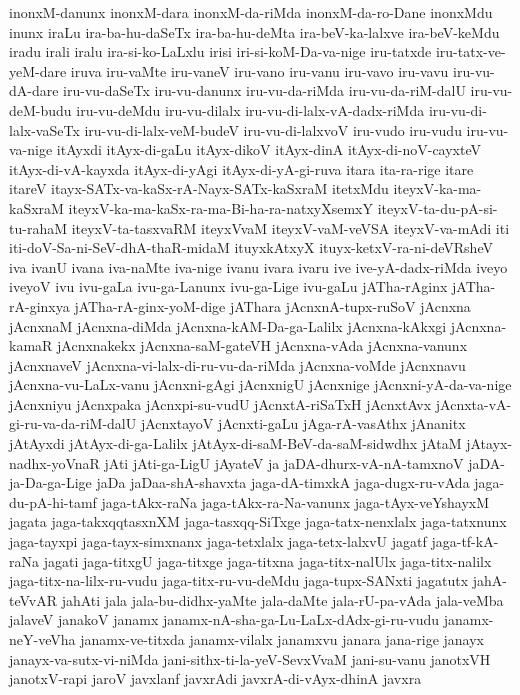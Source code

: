 {inonxM-danunx
inonxM-dara
inonxM-da-riMda
inonxM-da-ro-Dane
inonxMdu
inunx
iraLu
ira-ba-hu-daSeTx
ira-ba-hu-deMta
ira-beV-ka-lalxve
ira-beV-keMdu
iradu
irali
iralu
ira-si-ko-LaLxlu
irisi
iri-si-koM-Da-va-nige
iru-tatxde
iru-tatx-ve-yeM-dare
iruva
iru-vaMte
iru-vaneV
iru-vano
iru-vanu
iru-vavo
iru-vavu
iru-vu-dA-dare
iru-vu-daSeTx
iru-vu-danunx
iru-vu-da-riMda
iru-vu-da-riM-dalU
iru-vu-deM-budu
iru-vu-deMdu
iru-vu-dilalx
iru-vu-di-lalx-vA-dadx-riMda
iru-vu-di-lalx-vaSeTx
iru-vu-di-lalx-veM-budeV
iru-vu-di-lalxvoV
iru-vudo
iru-vudu
iru-vu-va-nige
itAyxdi
itAyx-di-gaLu
itAyx-dikoV
itAyx-dinA
itAyx-di-noV-cayxteV
itAyx-di-vA-kayxda
itAyx-di-yAgi
itAyx-di-yA-gi-ruva
itara
ita-ra-rige
itare
itareV
itayx-SATx-va-kaSx-rA-Nayx-SATx-kaSxraM
itetxMdu
iteyxV-ka-ma-kaSxraM
iteyxV-ka-ma-kaSx-ra-ma-Bi-ha-ra-natxyXsemxY
iteyxV-ta-du-pA-si-tu-rahaM
iteyxV-ta-tasxvaRM
iteyxVvaM
iteyxV-vaM-veVSA
iteyxV-va-mAdi
iti
iti-doV-Sa-ni-SeV-dhA-thaR-midaM
ituyxkAtxyX
ituyx-ketxV-ra-ni-deVRsheV
iva
ivanU
ivana
iva-naMte
iva-nige
ivanu
ivara
ivaru
ive
ive-yA-dadx-riMda
iveyo
iveyoV
ivu
ivu-gaLa
ivu-ga-Lanunx
ivu-ga-Lige
ivu-gaLu
jATha-rAginx
jATha-rA-ginxya
jATha-rA-ginx-yoM-dige
jAThara
jAcnxnA-tupx-ruSoV
jAcnxna
jAcnxnaM
jAcnxna-diMda
jAcnxna-kAM-Da-ga-Lalilx
jAcnxna-kAkxgi
jAcnxna-kamaR
jAcnxnakekx
jAcnxna-saM-gateVH
jAcnxna-vAda
jAcnxna-vanunx
jAcnxnaveV
jAcnxna-vi-lalx-di-ru-vu-da-riMda
jAcnxna-voMde
jAcnxnavu
jAcnxna-vu-LaLx-vanu
jAcnxni-gAgi
jAcnxnigU
jAcnxnige
jAcnxni-yA-da-va-nige
jAcnxniyu
jAcnxpaka
jAcnxpi-su-vudU
jAcnxtA-riSaTxH
jAcnxtAvx
jAcnxta-vA-gi-ru-va-da-riM-dalU
jAcnxtayoV
jAcnxti-gaLu
jAga-rA-vasAthx
jAnanitx
jAtAyxdi
jAtAyx-di-ga-Lalilx
jAtAyx-di-saM-BeV-da-saM-sidwdhx
jAtaM
jAtayx-nadhx-yoVnaR
jAti
jAti-ga-LigU
jAyateV
ja
jaDA-dhurx-vA-nA-tamxnoV
jaDA-ja-Da-ga-Lige
jaDa
jaDaa-shA-shavxta
jaga-dA-timxkA
jaga-dugx-ru-vAda
jaga-du-pA-hi-tamf
jaga-tAkx-raNa
jaga-tAkx-ra-Na-vanunx
jaga-tAyx-veYshayxM
jagata
jaga-takxqqtasxnXM
jaga-tasxqq-SiTxge
jaga-tatx-nenxlalx
jaga-tatxnunx
jaga-tayxpi
jaga-tayx-simxnanx
jaga-tetxlalx
jaga-tetx-lalxvU
jagatf
jaga-tf-kA-raNa
jagati
jaga-titxgU
jaga-titxge
jaga-titxna
jaga-titx-nalUlx
jaga-titx-nalilx
jaga-titx-na-lilx-ru-vudu
jaga-titx-ru-vu-deMdu
jaga-tupx-SANxti
jagatutx
jahA-teVvAR
jahAti
jala
jala-bu-didhx-yaMte
jala-daMte
jala-rU-pa-vAda
jala-veMba
jalaveV
janakoV
janamx
janamx-nA-sha-ga-Lu-LaLx-dAdx-gi-ru-vudu
janamx-neY-veVha
janamx-ve-titxda
janamx-vilalx
janamxvu
janara
jana-rige
janayx
janayx-va-sutx-vi-niMda
jani-sithx-ti-la-yeV-SevxVvaM
jani-su-vanu
janotxVH
janotxV-rapi
jaroV
javxlanf
javxrAdi
javxrA-di-vAyx-dhinA
javxra
}
